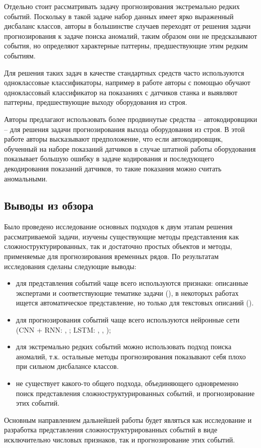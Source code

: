 Отдельно стоит рассматривать задачу прогнозирования экстремально редких событий. Поскольку в такой задаче набор данных имеет ярко выраженный дисбаланс классов, авторы в большинстве случаев переходят от решения задачи прогнозирования к задаче поиска аномалий, таким образом они не предсказывают события, но определяют характерные паттерны, предшествующие этим редким событиям.

Для решения таких задач в качестве стандартных средств часто используются одноклассовые классификаторы, например в работе \cite{anomaly_detection_oneclass} авторы с помощью обучают одноклассовый классификатор на показаниях с датчиков станка и выявляют паттерны, предшествующие выходу оборудования из строя.

Авторы \cite{anomaly_detection_ae} предлагают использовать более продвинутые средства -- автокодировщики -- для решения задачи прогнозирования выхода оборудования из строя. В этой работе авторы высказывают предположение, что если автокодировщик, обученный на наборе показаний датчиков в случае штатной работы оборудования показывает большую ошибку в задаче кодирования и последующего декодирования показаний датчиков, то такие показания можно считать аномальными.

\subsection{Выводы из обзора}
Было проведено исследование основных подходов к двум этапам решения рассматриваемой задачи, изучены существующие методы представления как сложноструктурированных, так и достаточно простых объектов и методы, применяемые для прогнозирования временных рядов. По результатам исследования сделаны следующие выводы:
\begin{itemize}
    \item для представления событий чаще всего используются признаки: описанные экспертами и соответствующие тематике задачи (\cite{twitter_predicting}), в некоторых работах ищется автоматическое представление, но только для текстовых описаний (\cite{struct_unstruct_prediction}).
    \item для прогнозирования событий чаще всего используются нейронные сети (CNN + RNN: \cite{traffic_flow_forecasting}, \cite{modeling_patterns_with_DNN}; LSTM: \cite{uber_mulitvar_forecasting}, \cite{predictive_monitoring_LSTM}, \cite{struct_unstruct_prediction});
    \item для экстремально редких событий можно использовать подход поиска аномалий, т.к. остальные методы прогнозирования показывают себя плохо при сильном дисбалансе классов.
    \item не существует какого-то общего подхода, объединяющего одновременно поиск представления сложноструктурированных событий, и прогнозирование этих событий.
\end{itemize}

Основным направлением дальнейшей работы будет являться как исследование и разработка представления сложноструктурированных событий в виде исключительно числовых признаков, так и прогнозирование этих событий.
